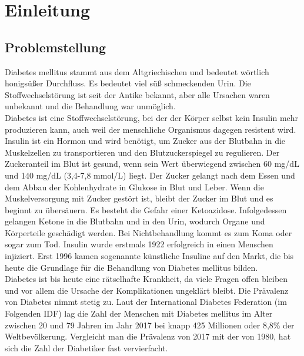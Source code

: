 \section*{Einleitung}
\subsection{Problemstellung}
	Diabetes mellitus stammt aus dem Altgriechischen und bedeutet wörtlich \glqq honigsüßer Durchfluss\grqq{}. Es bedeutet \glqq viel süß schmeckenden Urin\grqq{}. Die Stoffwechselstörung ist seit der Antike bekannt, aber alle Ursachen waren unbekannt und die Behandlung war unmöglich. \cite{SG}\\
	Diabetes ist eine Stoffwechselstörung, bei der der Körper selbst kein Insulin mehr produzieren kann, auch weil der menschliche Organismus dagegen resistent wird. Insulin ist ein Hormon und wird benötigt, um Zucker aus der Blutbahn in die Muskelzellen zu transportieren und den Blutzuckerspiegel zu regulieren. Der Zuckeranteil im Blut ist gesund, wenn sein Wert überwiegend zwischen 60 mg/dL und 140 mg/dL (3,4-7,8 mmol/L) liegt. Der Zucker gelangt nach dem Essen und dem Abbau der Kohlenhydrate in Glukose in Blut und Leber. Wenn die Muskelversorgung mit Zucker gestört ist, bleibt der Zucker im Blut und es beginnt zu übersäuern. Es besteht die Gefahr einer Ketoazidose. Infolgedessen gelangen Ketone in die Blutbahn und in den Urin, wodurch Organe und Körperteile geschädigt werden. Bei Nichtbehandlung kommt es zum Koma oder sogar zum Tod. Insulin wurde erstmals 1922 erfolgreich in einen Menschen injiziert. Erst 1996 kamen sogenannte künstliche Insuline auf den Markt, die bis heute die Grundlage für die Behandlung von Diabetes mellitus bilden. \cite{SG}\\
	Diabetes ist bis heute eine rätselhafte Krankheit, da viele Fragen offen bleiben und vor allem die Ursache der Komplikationen ungeklärt bleibt. Die Prävalenz von Diabetes nimmt stetig zu. Laut der International Diabetes Federation (im Folgenden IDF) lag die Zahl der Menschen mit Diabetes mellitus im Alter zwischen 20 und 79 Jahren im Jahr 2017 bei knapp 425 Millionen oder 8,8\% der Weltbevölkerung. Vergleicht man die Prävalenz von 2017 mit der von 1980, hat sich die Zahl der Diabetiker fast vervierfacht. \cite[S. 9]{IDF}\\
